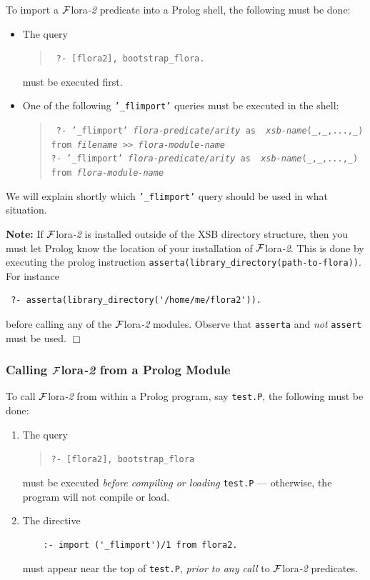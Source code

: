 \documentclass[11pt]{article}
\newcommand{\FLORA}{{\mbox{\sc ${\cal F}${lora}\rm\emph{-2}}}\xspace}
\begin{document}
To import a \FLORA predicate into a Prolog shell, the following must be done:
\begin{itemize}
\item The query
\begin{quote}
  \tt
     ?- [flora2], bootstrap\_flora.  
\end{quote}
must be executed first.
\item 
  One of the following {\tt '\_flimport'} queries must be executed in the shell:
  \begin{quote}
    \tt
        ?- '\_flimport' {\it flora-predicate/arity} as {\it
      xsb-name}(\_,\_,...,\_)\\
    \hspace*{5cm}from {\it filename} >> {\it flora-module-name}
    \\
        ?- '\_flimport' {\it flora-predicate/arity} as {\it 
      xsb-name}(\_,\_,...,\_)\\
    \hspace*{5cm}from {\it flora-module-name}
  \end{quote}
\end{itemize}
We will explain shortly which {\tt '\_flimport'} query should be used in what
situation.

\noindent
{\bf Note:} If \FLORA is installed outside of the XSB directory structure,
then you must let Prolog know the location of your installation of \FLORA.
This is done by executing the prolog instruction 
{\tt asserta(library\_directory(path-to-flora))}. For instance
\begin{verbatim}
 ?- asserta(library_directory('/home/me/flora2')).  
\end{verbatim}
before calling any of the \FLORA modules. Observe that {\tt asserta} and
\emph{not} {\tt assert} must be used.
\hfill $\Box$

\subsubsection{Calling \FLORA from a Prolog Module}

To call \FLORA from within a Prolog program, say {\tt test.P}, the
following must be done:
\begin{enumerate}
\item  The query 
  \begin{quote}
    {\tt ?- [flora2], bootstrap\_flora} 
  \end{quote}
  must be executed \emph{before compiling or loading} {\tt test.P} ---
  otherwise, the program will not compile or load.
\item The directive
  \begin{verbatim}
    :- import ('_flimport')/1 from flora2.
  \end{verbatim}
  must appear near the top of {\tt test.P}, \emph{prior to any call} to
  \FLORA predicates.
\end{enumerate}
\end{document}
